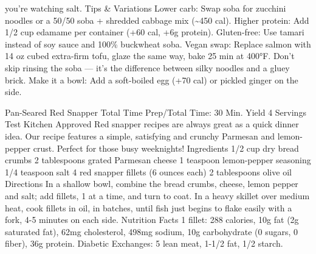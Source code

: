 you're watching salt. Tips \& Variations Lower carb: Swap soba for zucchini noodles or a 50/50 soba + shredded cabbage mix (\~{}450 cal). Higher protein: Add 1/2 cup edamame per container (+60 cal, +6g protein). Gluten-free: Use tamari instead of soy sauce and 100\% buckwheat soba. Vegan swap: Replace salmon with 14 oz cubed extra-firm tofu, glaze the same way, bake 25 min at 400°F. Don't skip rinsing the soba — it's the difference between silky noodles and a gluey brick. Make it a bowl: Add a soft-boiled egg (+70 cal) or pickled ginger on the side.
\par

Pan-Seared Red Snapper Total Time Prep/Total Time: 30 Min. Yield 4 Servings Test Kitchen Approved Red snapper recipes are always great as a quick dinner idea. Our recipe features a simple, satisfying and crunchy Parmesan and lemon-pepper crust. Perfect for those busy weeknights! Ingredients 1/2 cup dry bread crumbs 2 tablespoons grated Parmesan cheese 1 teaspoon lemon-pepper seasoning 1/4 teaspoon salt 4 red snapper fillets (6 ounces each) 2 tablespoons olive oil Directions In a shallow bowl, combine the bread crumbs, cheese, lemon pepper and salt; add fillets, 1 at a time, and turn to coat. In a heavy skillet over medium heat, cook fillets in oil, in batches, until fish just begins to flake easily with a fork, 4-5 minutes on each side. Nutrition Facts 1 fillet: 288 calories, 10g fat (2g saturated fat), 62mg cholesterol, 498mg sodium, 10g carbohydrate (0 sugars, 0 fiber), 36g protein. Diabetic Exchanges: 5 lean meat, 1-1/2 fat, 1/2 starch.
\par

